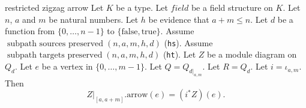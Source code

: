 \begin{cleanresult}{restricted zigzag arrow}
Let $K$ be a type.
Let $\mathit{field}$ be a field structure on $K$.
Let $n$, $a$ and $m$ be natural numbers.
Let $h$ be evidence that $a+m\le n$.
Let $d$ be a function from $\{0,\ldots,n-1\}$ to $\{\mathrm{false},\mathrm{true}\}$.
Assume $\operatorname{subpath\ sources\ preserved}(n, a, m, h, d)$ (\texttt{hs}).
Assume $\operatorname{subpath\ targets\ preserved}(n, a, m, h, d)$ (\texttt{ht}).
Let $Z$ be a module diagram on $Q_{d}$.
Let $e$ be a vertex in $\{0,\ldots,m-1\}$.
Let $Q = Q_{d|_{a,m}}$.
Let $R = Q_{d}$.
Let $i = \iota_{a,m}$.
Then \[Z|_{[a,a+m]}.\mathrm{arrow}(e)=(i^{*}Z)(e).\]
\end{cleanresult}

